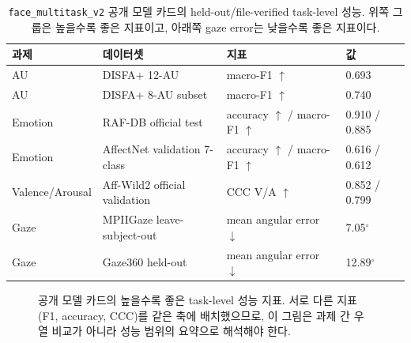 \documentclass[11pt]{article}
\newcommand{\model}{\texttt{face\_multitask\_v2}}
\begin{document}
\begin{table}[t]
\centering
\caption{\model{} 공개 모델 카드의 held-out/file-verified task-level 성능. 위쪽 그룹은 높을수록 좋은 지표이고, 아래쪽 gaze error는 낮을수록 좋은 지표이다.}
\label{tab:modelcard}
\begin{tabularx}{\linewidth}{lXll}
\toprule
과제 & 데이터셋 & 지표 & 값 \\
\midrule
AU & DISFA+ 12-AU & macro-F1 $\uparrow$ & 0.693 \\
AU & DISFA+ 8-AU subset & macro-F1 $\uparrow$ & 0.740 \\
Emotion & RAF-DB official test & accuracy $\uparrow$ / macro-F1 $\uparrow$ & 0.910 / 0.885 \\
Emotion & AffectNet validation 7-class & accuracy $\uparrow$ / macro-F1 $\uparrow$ & 0.616 / 0.612 \\
Valence/Arousal & Aff-Wild2 official validation & CCC V/A $\uparrow$ & 0.852 / 0.799 \\
\midrule
Gaze & MPIIGaze leave-subject-out & mean angular error $\downarrow$ & 7.05$^\circ$ \\
Gaze & Gaze360 held-out & mean angular error $\downarrow$ & 12.89$^\circ$ \\
\bottomrule
\end{tabularx}
\end{table}

\begin{figure}[t]
\centering
{}
\caption{공개 모델 카드의 높을수록 좋은 task-level 성능 지표. 서로 다른 지표(F1, accuracy, CCC)를 같은 축에 배치했으므로, 이 그림은 과제 간 우열 비교가 아니라 성능 범위의 요약으로 해석해야 한다.}
\label{fig:modelcard-bars}
\end{figure}
\end{document}
